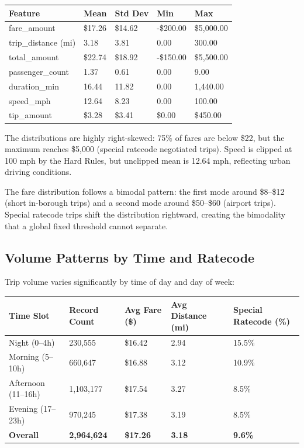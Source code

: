 \begin{longtable}{|m{4cm}|m{2.5cm}|m{2.5cm}|m{2.5cm}|m{2.5cm}|}
\hline
\textbf{Feature} & \textbf{Mean} & \textbf{Std Dev} & \textbf{Min} & \textbf{Max} \\ \hline
fare\_amount & \$17.26 & \$14.62 & -\$200.00 & \$5,000.00 \\ \hline
trip\_distance (mi) & 3.18 & 3.81 & 0.00 & 300.00 \\ \hline
total\_amount & \$22.74 & \$18.92 & -\$150.00 & \$5,500.00 \\ \hline
passenger\_count & 1.37 & 0.61 & 0.00 & 9.00 \\ \hline
duration\_min & 16.44 & 11.82 & 0.00 & 1,440.00 \\ \hline
speed\_mph & 12.64 & 8.23 & 0.00 & 100.00 \\ \hline
tip\_amount & \$3.28 & \$3.41 & \$0.00 & \$450.00 \\ \hline
\end{longtable}

The distributions are highly right-skewed: 75\% of fares are below \$22, but the maximum reaches \$5,000 (special ratecode negotiated trips). Speed is clipped at 100 mph by the Hard Rules, but unclipped mean is 12.64 mph, reflecting urban driving conditions.

The fare distribution follows a bimodal pattern: the first mode around \$8--\$12 (short in-borough trips) and a second mode around \$50--\$60 (airport trips). Special ratecode trips shift the distribution rightward, creating the bimodality that a global fixed threshold cannot separate.

\subsection{Volume Patterns by Time and Ratecode}

Trip volume varies significantly by time of day and day of week:

\begin{longtable}{|m{3cm}|m{3cm}|m{3cm}|m{3cm}|m{3cm}|}
\hline
\textbf{Time Slot} & \textbf{Record Count} & \textbf{Avg Fare (\$)} & \textbf{Avg Distance (mi)} & \textbf{Special Ratecode (\%)} \\ \hline
Night (0--4h) & 230,555 & \$16.42 & 2.94 & 15.5\% \\ \hline
Morning (5--10h) & 660,647 & \$16.88 & 3.12 & 10.9\% \\ \hline
Afternoon (11--16h) & 1,103,177 & \$17.54 & 3.27 & 8.5\% \\ \hline
Evening (17--23h) & 970,245 & \$17.38 & 3.19 & 8.5\% \\ \hline
\textbf{Overall} & \textbf{2,964,624} & \textbf{\$17.26} & \textbf{3.18} & \textbf{9.6\%} \\ \hline
\end{longtable}

